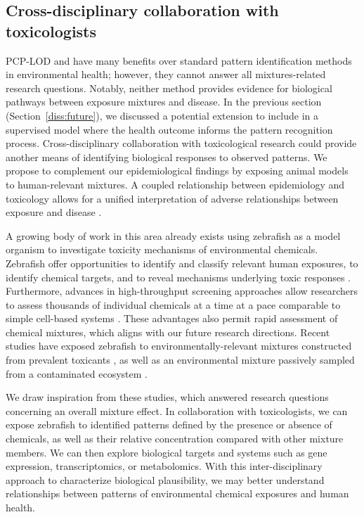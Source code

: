 \subsection{Cross-disciplinary collaboration with toxicologists}
PCP-LOD and \bnmf have many benefits over standard pattern identification methods in environmental health; however, they cannot answer all mixtures-related research questions. Notably, neither method provides evidence for biological pathways between exposure mixtures and disease. In the previous section (Section~\ref{diss:future}), we discussed a potential extension to include \bnmf in a supervised model where the health outcome informs the pattern recognition process. Cross-disciplinary collaboration with toxicological research could provide another means of identifying biological responses to observed patterns. We propose to complement our epidemiological findings by exposing animal models to human-relevant mixtures. A coupled relationship between epidemiology and toxicology allows for a unified interpretation of adverse relationships between exposure and disease \citep{adami2011toxicology}.

A growing body of work in this area already exists using zebrafish as a model organism to investigate toxicity mechanisms of environmental chemicals. Zebrafish offer opportunities to identify and classify relevant human exposures, to identify chemical targets, and to reveal mechanisms underlying toxic responses \citep{vaz2019zebrafish}. Furthermore, advances in high-throughput screening approaches allow researchers to assess thousands of individual chemicals at a time at a pace comparable to simple cell-based systems \citep{tanguay2018rise}. These advantages also permit rapid assessment of chemical mixtures, which aligns with our future research directions. Recent studies have exposed zebrafish to environmentally-relevant mixtures constructed from prevalent toxicants \citep{geier2018systematic}, as well as an environmental mixture passively sampled from a contaminated ecosystem \citep{bergmann2017using, allan2012bridging}. 

We draw inspiration from these studies, which answered research questions concerning an overall mixture effect. In collaboration with toxicologists, we can expose zebrafish to identified patterns defined by the presence or absence of chemicals, as well as their relative concentration compared with other mixture members. We can then explore biological targets and systems such as gene expression, transcriptomics, or metabolomics. With this inter-disciplinary approach to characterize biological plausibility, we may better understand relationships between patterns of environmental chemical exposures and human health.

